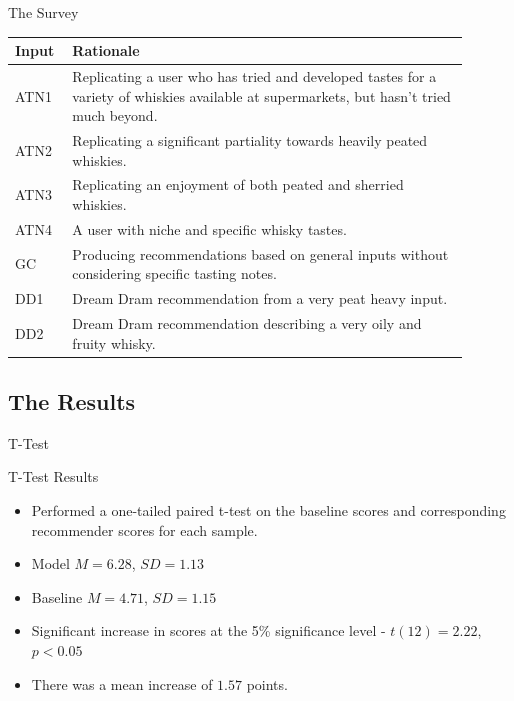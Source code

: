 \documentclass{beamer}
\begin{document}
\begin{frame}{The Survey}
    \begin{table}
        \centering
        \begin{tabular}{p{0.1\linewidth} p{0.8\linewidth}} 
        \toprule
        Input & Rationale                                                                                                                                 \\ 
        \hline
        ATN1            & Replicating a user who has tried and developed tastes for a variety of whiskies available at supermarkets, but hasn't tried much beyond.  \\
        ATN2            & Replicating a significant partiality towards heavily peated whiskies.                                                                     \\
        ATN3            & Replicating an enjoyment of both peated and sherried whiskies.                                                                            \\
        ATN4            & A user with niche and specific whisky tastes.                                                                                             \\
        GC              & Producing recommendations based on general inputs without considering specific tasting notes.                                            \\
        DD1             & Dream Dram recommendation from a very peat heavy input.                                                                                   \\
        DD2             & Dream Dram recommendation describing a very oily and fruity whisky.                                                                       \\
        \bottomrule
        \end{tabular}
    \end{table}
\end{frame}

\subsection{The Results}

\begin{frame}{T-Test}
    \begin{block}{T-Test Results}
        \begin{itemize}
            \item Performed a one-tailed paired t-test on the baseline scores and corresponding recommender scores for each sample.
            \item Model $M=6.28$, $SD=1.13$
            \item Baseline $M=4.71$, $SD=1.15$
            \item Significant increase in scores at the 5\% significance level - $t(12) = 2.22$, $p<0.05$
            \item There was a mean increase of $1.57$ points.
        \end{itemize}
    \end{block}
\end{frame}
\end{document}
